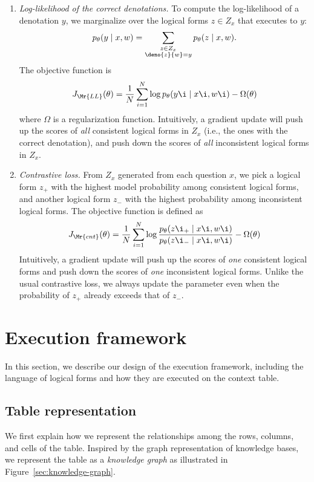 \begin{enumerate}
\item \emph{Log-likelihood of the correct denotations.}
To compute the log-likelihood of a denotation $y$,
we marginalize
over the logical forms $z \in Z_{x}$
that executes to $y$:
\begin{equation}
p_\theta(y \mid x, w) =
\sum_{\substack{z \in Z_x \\ \deno{z}{w} = y}}
p_\theta(z \mid x, w).
\end{equation}
The objective function is
\begin{equation}
J_\Mr{LL}(\theta) = 
\frac{1}{N} \sum_{i=1}^N \log p_\theta(y\i\mid x\i, w\i)
- \Omega(\theta)
\end{equation}
where $\Omega$ is a regularization function.
Intuitively, a gradient update
will push up the scores of \emph{all}
consistent logical forms in $Z_x$
(i.e., the ones with the correct denotation),
and push down the scores of \emph{all}
inconsistent logical forms in $Z_x$.

\item \emph{Contrastive loss.}
From $Z_x$ generated from each question $x$,
we pick a logical form $z_+$
with the highest model probability among consistent
logical forms,
and another logical form $z_-$ with the highest
probability among inconsistent logical forms.
The objective function is defined as
\begin{equation}
J_\Mr{cnt}(\theta) =
\frac{1}{N} \sum_{i=1}^N \log
\frac{p_\theta(z\i_+\mid x\i, w\i)}{p_\theta(z\i_-\mid x\i, w\i)}
- \Omega(\theta)
\end{equation}
Intuitively, a gradient update
will push up the scores of \emph{one}
consistent logical forms
and push down the scores of \emph{one}
inconsistent logical forms.
Unlike the usual contrastive loss,
we always update the parameter
even when the probability of $z_+$
already exceeds that of $z_-$.
\end{enumerate}

\section{Execution framework}
In this section, we describe our design of the execution framework,
including the language of logical forms
and how they are executed on the context table.

\subsection{Table representation}
We first explain how we represent the 
relationships among the rows,
columns, and cells of the table.
Inspired by the graph representation of knowledge bases,
we represent the table as a \emph{knowledge graph}
as illustrated in Figure~\ref{sec:knowledge-graph}.

